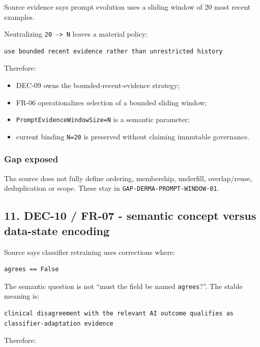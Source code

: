\documentclass[11pt,a4paper]{article}
\providecommand{\tightlist}{\setlength{\itemsep}{0pt}\setlength{\parskip}{0pt}}
\begin{document}
Source evidence says prompt evolution uses a sliding window of 20 most
recent examples.

Neutralizing \texttt{20\ -\textgreater{}\ N} leaves a material policy:

\begin{verbatim}
use bounded recent evidence rather than unrestricted history
\end{verbatim}

Therefore:

\begin{itemize}
\tightlist
\item
  DEC-09 owns the bounded-recent-evidence strategy;
\item
  FR-06 operationalizes selection of a bounded sliding window;
\item
  \texttt{PromptEvidenceWindowSize=N} is a semantic parameter;
\item
  current binding \texttt{N=20} is preserved without claiming immutable
  governance.
\end{itemize}

\subsubsection{Gap exposed}\label{gap-exposed}

The source does not fully define ordering, membership, underfill,
overlap/reuse, deduplication or scope. These stay in
\texttt{GAP-DERMA-PROMPT-WINDOW-01}.

\subsection{11. DEC-10 / FR-07 - semantic concept versus data-state
encoding}\label{11-dec-10--fr-07---semantic-concept-versus-data-state-encoding}

Source says classifier retraining uses corrections where:

\begin{verbatim}
agrees == False
\end{verbatim}

The semantic question is not ``must the field be named
\texttt{agrees}?''. The stable meaning is:

\begin{verbatim}
clinical disagreement with the relevant AI outcome qualifies as classifier-adaptation evidence
\end{verbatim}

Therefore:
\end{document}
